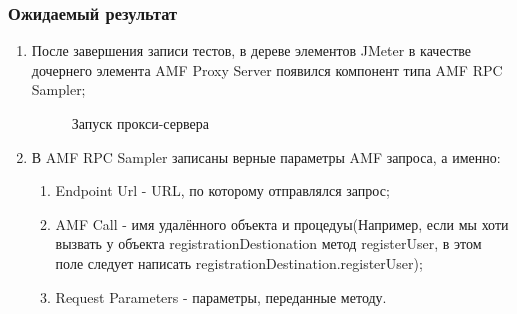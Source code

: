 \subsubsection{Ожидаемый результат}

\begin{enumerate}
\item  После завершения записи тестов, в дереве элементов JMeter в качестве дочернего элемента AMF Proxy Server
появился компонент типа AMF RPC Sampler;

\begin{figure}[h]
\caption{Запуск прокси-сервера}
\label{ris:proxyStart.png}
\end{figure}

\item В AMF RPC Sampler записаны верные параметры AMF запроса, а именно:

\begin{enumerate}
\item Endpoint Url - URL, по которому отправлялся запрос;
\item AMF Call - имя удалённого объекта и процедуы(Например, если мы хоти вызвать у объекта registrationDestionation метод registerUser,
в этом поле следует написать registrationDestination.registerUser);
\item Request Parameters - параметры, переданные методу.
\end{enumerate}


\end{enumerate}
